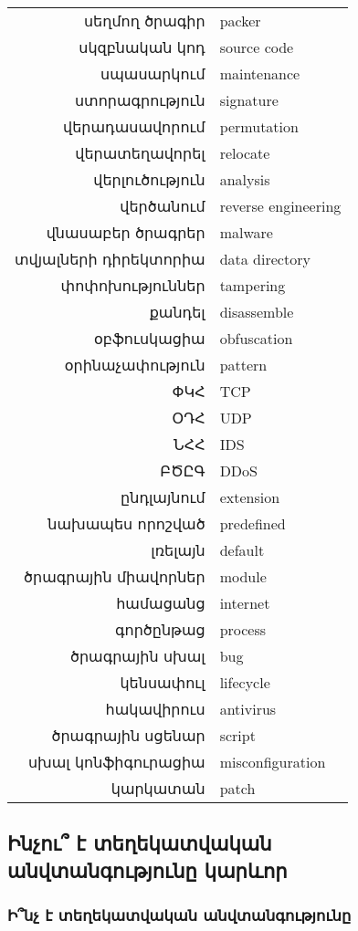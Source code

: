 \documentclass[12pt]{article}
\begin{document}
\begin{sloppypar}
\begin{tabular}{rl}
սեղմող ծրագիր&packer \\
սկզբնական կոդ&source code \\
սպասարկում&maintenance \\
ստորագրություն&signature \\
վերադասավորում&permutation \\
վերատեղավորել&relocate \\
վերլուծություն&analysis \\
վերծանում&reverse engineering \\
վնասաբեր ծրագրեր&malware \\
տվյալների դիրեկտորիա&data directory \\
փոփոխություններ&tampering \\
քանդել&disassemble \\
օբֆուսկացիա&obfuscation \\
օրինաչափություն&pattern \\
ՓԿՀ&TCP \\
ՕԴՀ&UDP \\
ՆՀՀ&IDS \\
ԲԾԸԳ&DDoS \\
ընդլայնում&extension \\
նախապես որոշված&predefined \\
լռելայն&default \\
ծրագրային միավորներ&module \\
համացանց&internet \\
գործընթաց&process \\
ծրագրային սխալ&bug \\
կենսափուլ&lifecycle \\
հակավիրուս&antivirus \\
ծրագրային սցենար&script \\
սխալ կոնֆիգուրացիա&misconfiguration \\
կարկատան&patch \\
\end{tabular}


\subsection{Ինչու՞ է տեղեկատվական անվտանգությունը կարևոր}


\subsubsection{Ի՞նչ է տեղեկատվական անվտանգությունը}


\end{sloppypar}
\end{document}
